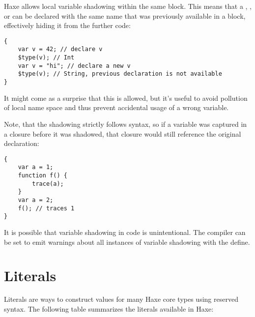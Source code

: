 Haxe allows local variable shadowing within the same block. This means that
a , , or  can be declared with the same name that was previously available in a block, effectively hiding it from the further code:

\begin{lstlisting}
{
	var v = 42; // declare v
	$type(v); // Int
	var v = "hi"; // declare a new v
	$type(v); // String, previous declaration is not available
}
\end{lstlisting}

It might come as a surprise that this is allowed, but it's useful to avoid pollution of local name space and thus prevent accidental usage of a wrong variable.

Note, that the shadowing strictly follows syntax, so if a variable was captured
in a closure before it was shadowed, that closure would still reference the
original declaration:

\begin{lstlisting}
{
	var a = 1;
	function f() {
	    trace(a);
	}
	var a = 2;
	f(); // traces 1
}
\end{lstlisting}


It is possible that variable shadowing in code is unintentional. The compiler can be set to emit warnings about all instances of variable shadowing with the  define.


\section{Literals}
\label{expression-literals}

Literals are ways to construct values for many Haxe core types using reserved syntax. The following table summarizes the literals available in Haxe:

